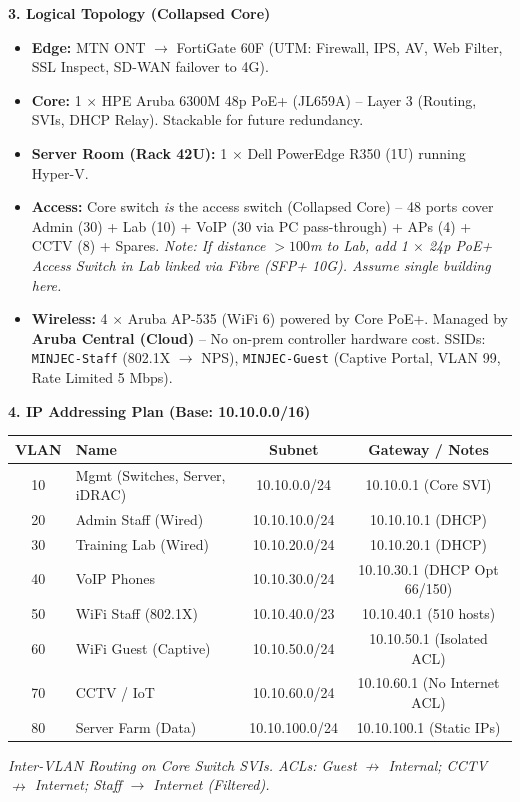 \documentclass[11pt]{article}
\begin{document}
\begin{exoresolu}
\noindent\textbf{3. Logical Topology (Collapsed Core)}
\begin{itemize}
    \item \textbf{Edge:} MTN ONT $\rightarrow$ FortiGate 60F (UTM: Firewall, IPS, AV, Web Filter, SSL Inspect, SD-WAN failover to 4G).
    \item \textbf{Core:} 1 $\times$ HPE Aruba 6300M 48p PoE+ (JL659A) -- Layer 3 (Routing, SVIs, DHCP Relay). Stackable for future redundancy.
    \item \textbf{Server Room (Rack 42U):} 1 $\times$ Dell PowerEdge R350 (1U) running Hyper-V.
    \item \textbf{Access:} Core switch \emph{is} the access switch (Collapsed Core) -- 48 ports cover Admin (30) + Lab (10) + VoIP (30 via PC pass-through) + APs (4) + CCTV (8) + Spares. \textit{Note: If distance $>100$m to Lab, add 1 $\times$ 24p PoE+ Access Switch in Lab linked via Fibre (SFP+ 10G). Assume single building here.}
    \item \textbf{Wireless:} 4 $\times$ Aruba AP-535 (WiFi 6) powered by Core PoE+. Managed by \textbf{Aruba Central (Cloud)} -- No on-prem controller hardware cost. SSIDs: \texttt{MINJEC-Staff} (802.1X $\rightarrow$ NPS), \texttt{MINJEC-Guest} (Captive Portal, VLAN 99, Rate Limited 5 Mbps).
\end{itemize}

\noindent\textbf{4. IP Addressing Plan (Base: 10.10.0.0/16)}
\begin{center}
\begin{tabular}{|c|l|c|c|}
\hline
\rowcolor{popblueL}
\textbf{VLAN} & \textbf{Name} & \textbf{Subnet} & \textbf{Gateway / Notes} \\
\hline
10 & Mgmt (Switches, Server, iDRAC) & 10.10.0.0/24 & 10.10.0.1 (Core SVI) \\
20 & Admin Staff (Wired) & 10.10.10.0/24 & 10.10.10.1 (DHCP) \\
30 & Training Lab (Wired) & 10.10.20.0/24 & 10.10.20.1 (DHCP) \\
40 & VoIP Phones & 10.10.30.0/24 & 10.10.30.1 (DHCP Opt 66/150) \\
50 & WiFi Staff (802.1X) & 10.10.40.0/23 & 10.10.40.1 (510 hosts) \\
60 & WiFi Guest (Captive) & 10.10.50.0/24 & 10.10.50.1 (Isolated ACL) \\
70 & CCTV / IoT & 10.10.60.0/24 & 10.10.60.1 (No Internet ACL) \\
80 & Server Farm (Data) & 10.10.100.0/24 & 10.10.100.1 (Static IPs) \\
\hline
\end{tabular}
\end{center}
\textit{Inter-VLAN Routing on Core Switch SVIs. ACLs: Guest $\nrightarrow$ Internal; CCTV $\nrightarrow$ Internet; Staff $\rightarrow$ Internet (Filtered).}


\end{exoresolu}
\end{document}

